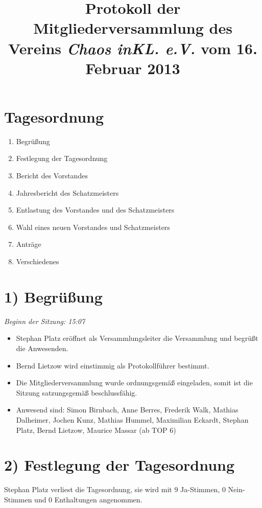 \documentclass{scrartcl}
\title{Protokoll der Mitgliederversammlung des Vereins \emph{Chaos inKL. e.V.} vom 16. Februar 2013}
\begin{document}
 
\maketitle

\section*{Tagesordnung}

\begin{enumerate}
  \setlength{\itemsep}{1pt}
  \item Begrüßung
  \item Festlegung der Tagesordnung
  \item Bericht des Vorstandes
  \item Jahresbericht des Schatzmeisters
  \item Entlastung des Vorstandes und des Schatzmeisters
  \item Wahl eines neuen Vorstandes und Schatzmeisters
  \item Anträge
  \item Verschiedenes
\end{enumerate}

\section*{1) Begrüßung}

    \emph{Beginn der Sitzung: 15:07}\\
    \begin{itemize}
     \item Stephan Platz eröffnet als Versammlungsleiter die Versammlung und begrüßt die Anwesenden.
     \item Bernd Lietzow wird einstimmig als Protokollführer bestimmt.
     \item Die Mitgliederversammlung wurde ordnungsgemäß eingeladen, somit ist die Sitzung satzungsgemäß beschlussfähig.
     \item Anwesend sind:  Simon Birnbach, Anne Berres, Frederik Walk, Mathias Dalheimer, Jochen Kunz, Mathias Hummel, Maximilian Eckardt, Stephan Platz, Bernd Lietzow, Maurice Massar (ab TOP 6) 
    \end{itemize}

\section*{2) Festlegung der Tagesordnung}
    
    Stephan Platz verliest die Tagesordnung, sie wird mit 9 Ja-Stimmen, 0 Nein-Stimmen und 0 Enthaltungen angenommen.
\end{document}
